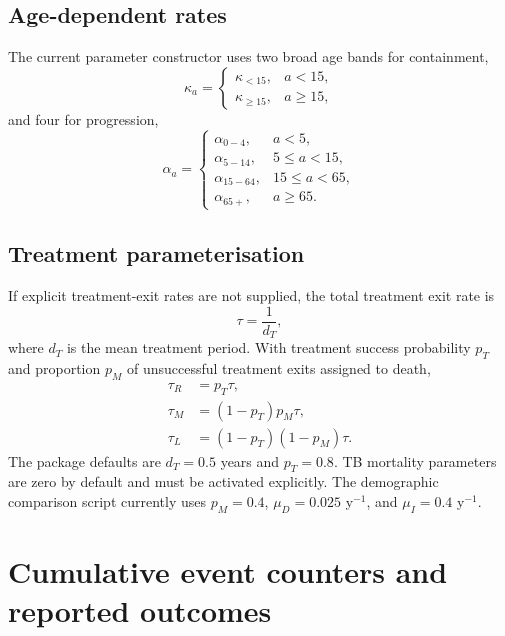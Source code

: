 \documentclass[11pt]{article}
\begin{document}
\subsection{Age-dependent rates}

The current parameter constructor uses two broad age bands for containment,
\begin{equation}
\kappa_a=\begin{cases}
\kappa_{<15}, & a<15,\\
\kappa_{\ge15}, & a\ge15,
\end{cases}
\end{equation}
and four for progression,
\begin{equation}
\alpha_a=\begin{cases}
\alpha_{0-4},&a<5,\\
\alpha_{5-14},&5\le a<15,\\
\alpha_{15-64},&15\le a<65,\\
\alpha_{65+},&a\ge65.
\end{cases}
\label{eq:progressionage}
\end{equation}

\subsection{Treatment parameterisation}

If explicit treatment-exit rates are not supplied, the total treatment exit rate is
\begin{equation}
\tau=\frac{1}{d_T},
\end{equation}
where $d_T$ is the mean treatment period. With treatment success probability $p_T$ and proportion $p_M$ of unsuccessful treatment exits assigned to death,
\begin{align}
\tau_R &=p_T\tau,\\
\tau_M &=(1-p_T)p_M\tau,\\
\tau_L &=(1-p_T)(1-p_M)\tau.
\end{align}
The package defaults are $d_T=0.5$ years and $p_T=0.8$. TB mortality parameters are zero by default and must be activated explicitly. The demographic comparison script currently uses $p_M=0.4$, $\mu_D=0.025$ y$^{-1}$, and $\mu_I=0.4$ y$^{-1}$.

\section{Cumulative event counters and reported outcomes}
\end{document}
